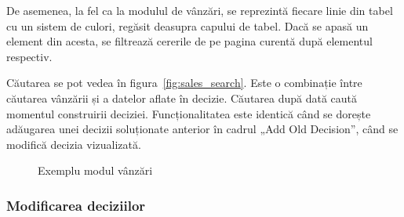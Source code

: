 		De asemenea, la fel ca la modulul de vânzări, se reprezintă fiecare linie din tabel cu un sistem de culori, regăsit deasupra capului de tabel.
		Dacă se apasă un element din acesta, se filtrează cererile de pe pagina curentă după elementul respectiv.

		Căutarea se pot vedea în figura~\ref{fig:sales_search}.
		Este o combinație între căutarea vânzării și a datelor aflate în decizie.
		Căutarea după dată caută momentul construirii deciziei.
		Funcționalitatea este identică când se dorește adăugarea unei decizii soluționate anterior în cadrul „Add Old Decision”, când se modifică decizia vizualizată.

		\begin{figure}
			\centering
			\caption{Exemplu modul vânzări}
		\end{figure}

		\subsubsection{Modificarea deciziilor}

